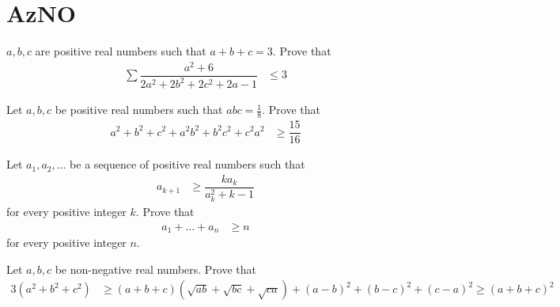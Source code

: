 \documentclass{subfile}
\begin{document}
	\section{AzNO}\label{sec:azno}
	
		\begin{problem}
			$a,b,c$ are positive real numbers such that $a+b+c=3$. Prove that
				\begin{align*}
					\sum\dfrac{a^{2}+6}{2a^{2}+2b^{2}+2c^{2}+2a-1}
						& \leq3
				\end{align*}
		\end{problem}
	
		\begin{problem}
			Let $a,b,c$ be positive real numbers such that $abc=\frac{1}{8}$. Prove that
				\begin{align*}
					a^{2}+b^{2}+c^{2}+a^{2}b^{2}+b^{2}c^{2}+c^{2}a^{2}
						& \geq\dfrac{15}{16}
				\end{align*}
		\end{problem}
	
		\begin{problem}
			Let $a_{1},a_{2},\ldots$ be a sequence of positive real numbers such that
				\begin{align*}
					a_{k+1}
						& \geq\dfrac{ka_{k}}{a_{k}^{2}+k-1}
				\end{align*}
			for every positive integer $k$. Prove that
				\begin{align*}
					a_{1}+\ldots+a_{n}
						& \geq n
				\end{align*}
			for every positive integer $n$.
		\end{problem}
	
		\begin{problem}
			Let $a,b,c$ be non-negative real numbers. Prove that
				\begin{align*}
					3(a^{2}+b^{2}+c^{2})
						& \geq (a+b+c)\left(\sqrt{ab}+\sqrt{bc}+\sqrt{ca}\right)+(a-b)^{2}+(b-c)^{2}+(c-a)^{2}
						  \geq (a+b+c)^{2}
				\end{align*}
		\end{problem}
\end{document}
